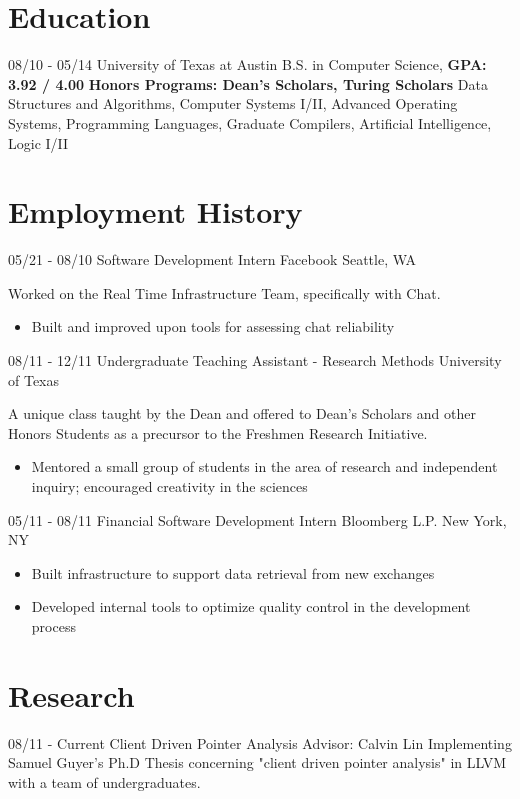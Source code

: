 \documentclass[11pt,letter,sans]{moderncv}
\begin{document}
\maketitle

\section{Education}
\cventry
{08/10 - 05/14}
{University of Texas at Austin}
{B.S. in Computer Science, \textbf{GPA: 3.92 / 4.00}}
{}
{}
{\textbf{Honors Programs: Dean's Scholars, Turing Scholars}}
{ Data Structures and Algorithms, Computer
  Systems I/II, Advanced Operating Systems, Programming Languages, Graduate
Compilers, Artificial Intelligence, Logic I/II}


\section{Employment History}
\cventry
{05/21 - 08/10}
{Software Development Intern}
{Facebook}
{Seattle, WA}
{}
{Worked on the Real Time Infrastructure Team, specifically with Chat.
  \begin{itemize}
    \item Built and improved upon tools for assessing chat reliability
\end{itemize}}

\cventry
{08/11 - 12/11}
{Undergraduate Teaching Assistant - Research Methods}
{University of Texas}
{}
{}
{A unique class taught by the Dean and offered to Dean's Scholars and other
  Honors Students as a precursor to the Freshmen Research Initiative.
  \begin{itemize}
    \item Mentored a small group of students in the area of research and
      independent inquiry; encouraged creativity in the sciences
\end{itemize}}

\cventry
{05/11 - 08/11}
{Financial Software Development Intern}
{Bloomberg L.P.}
{New York, NY}
{}
{
  \begin{itemize}
    \item Built infrastructure to support data retrieval from new exchanges
    \item Developed internal tools to optimize quality control in the
      development process
\end{itemize}}

\section{Research}
\cventry
{08/11 - Current}
{Client Driven Pointer Analysis}
{Advisor: Calvin Lin}
{}
{}
{Implementing Samuel Guyer's Ph.D Thesis concerning "client driven pointer
analysis" in LLVM with a team of undergraduates.}
\end{document}
